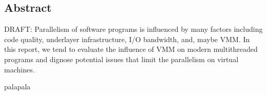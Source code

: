 \thispagestyle{empty}
\subsection*{\centering Abstract}
{\em

DRAFT: Parallelism of software programs is influenced by many factors 
including code quality, underlayer infrastructure, I/O bandwidth, and,
maybe VMM. In this report, we tend to evaluate the influence of VMM on 
modern multithreaded programs and dignose potential issues that limit 
the parallelism on virtual machines. 

palapala

}

